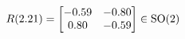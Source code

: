 \documentclass[preview]{standalone}
\begin{document}
\begin{align*}
\special{dvisvgm:raw <g id='unique000'>}R(2.21) = \begin{bmatrix} -0.59 & -0.80 \\ 0.80 & -0.59 \end{bmatrix} \in \text{SO}(2)\special{dvisvgm:raw </g>}
\end{align*}
\end{document}
